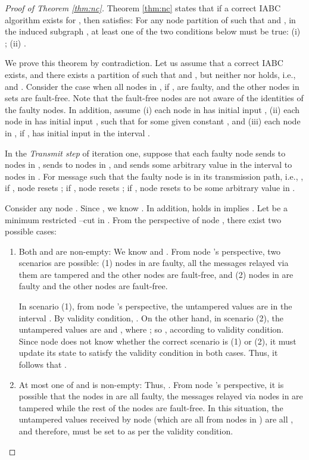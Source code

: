 \documentclass[letterpaper, 11pt]{article}
\begin{document}
\begin{proof}[Proof of Theorem \ref{thm:nc}]
Theorem \ref{thm:nc} states that if a correct IABC algorithm exists for ,  then  satisfies:
For any node partition  of  such that  and , in the induced subgraph ,
at least one of the two conditions below must be true: (i) ; (ii) .

We prove this theorem by contradiction. Let us assume that a correct IABC exists, and there exists a partition  of  such that  and , but neither  nor  holds, i.e.,   and . Consider the case when all nodes in , if , are faulty, and the other nodes in sets  are fault-free. Note that the fault-free nodes are not aware of the identities of the faulty nodes. In addition, assume (i) each node in  has initial input , (ii) each node in  has initial input , such that  for some given constant , and (iii) each node in , if , has initial input in the interval .

In the \textit{Transmit step} of iteration one, suppose that each faulty node  sends  to nodes in , sends  to nodes in , and sends some arbitrary value in the interval  to nodes in . For message  such that the faulty node  is in its transmission path, i.e.,
, if , node  resets ; if , node  resets ; if
, node  resets  to be some arbitrary value in .

Consider any node .
Since , we know .
In addition,   holds in  implies . Let  be a minimum restricted --cut in .
From the perspective of node , there exist two possible cases:

\begin{enumerate}[label=\emph{(\alph*)}]
\item Both  and  are non-empty: We know  and .  From node 's perspective, two scenarios are possible: (1) nodes in  are faulty, all the messages relayed via them are tampered and the other nodes are fault-free, and (2) nodes in  are faulty and the other nodes are fault-free.

In scenario (1), from node 's perspective, the untampered values are in the interval . By validity condition, . On the other hand, in scenario (2), the untampered values are  and , where ; so , according to validity condition. Since node  does not know whether the correct scenario is (1) or (2), it must update its state to satisfy the validity condition in both cases. Thus, it follows that .

\item At most one of  and  is non-empty: Thus, . From node 's perspective, it is possible that the nodes in  are all faulty, the messages relayed via nodes in  are tampered while the rest of the nodes are fault-free. In this situation, the untampered values received by node  (which are all from nodes in ) are all , and therefore,  must be set to  as per the validity condition.
\end{enumerate}


\end{proof}
\end{document}
